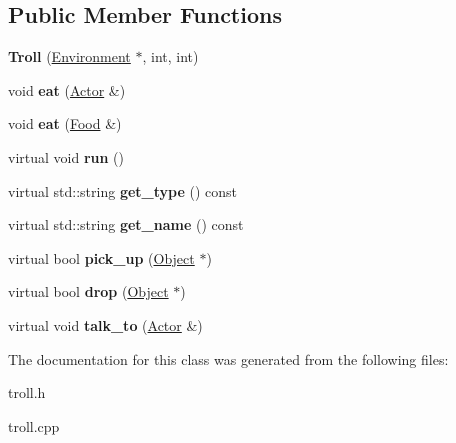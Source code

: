 \subsection*{Public Member Functions}
\begin{DoxyCompactItemize}
\item 
\hypertarget{classda__game_1_1Troll_a7b6cee5ab1339572982aa4f490b09b65}{
{\bfseries Troll} (\hyperlink{classda__game_1_1Environment}{Environment} $\ast$, int, int)}
\label{classda__game_1_1Troll_a7b6cee5ab1339572982aa4f490b09b65}

\item 
\hypertarget{classda__game_1_1Troll_a5ff7be42450036dee76060892ed52dd6}{
void {\bfseries eat} (\hyperlink{classda__game_1_1Actor}{Actor} \&)}
\label{classda__game_1_1Troll_a5ff7be42450036dee76060892ed52dd6}

\item 
\hypertarget{classda__game_1_1Troll_a50a5ca63166711c2ce631c6ec5cd2cad}{
void {\bfseries eat} (\hyperlink{classda__game_1_1Food}{Food} \&)}
\label{classda__game_1_1Troll_a50a5ca63166711c2ce631c6ec5cd2cad}

\item 
\hypertarget{classda__game_1_1Troll_a52d102598f13c6dea7311cc16d8bbc50}{
virtual void {\bfseries run} ()}
\label{classda__game_1_1Troll_a52d102598f13c6dea7311cc16d8bbc50}

\item 
\hypertarget{classda__game_1_1Troll_ac00b5c9350f950390cef9fcb365fd4e2}{
virtual std::string {\bfseries get\_\-type} () const }
\label{classda__game_1_1Troll_ac00b5c9350f950390cef9fcb365fd4e2}

\item 
\hypertarget{classda__game_1_1Troll_a1cedb77ac8a2c55cfec57fa26c8cd5a3}{
virtual std::string {\bfseries get\_\-name} () const }
\label{classda__game_1_1Troll_a1cedb77ac8a2c55cfec57fa26c8cd5a3}

\item 
\hypertarget{classda__game_1_1Troll_a5f287d22486248ee404460c9843d864b}{
virtual bool {\bfseries pick\_\-up} (\hyperlink{classda__game_1_1Object}{Object} $\ast$)}
\label{classda__game_1_1Troll_a5f287d22486248ee404460c9843d864b}

\item 
\hypertarget{classda__game_1_1Troll_a263bc077ba47e77a5811fccf9cd34be6}{
virtual bool {\bfseries drop} (\hyperlink{classda__game_1_1Object}{Object} $\ast$)}
\label{classda__game_1_1Troll_a263bc077ba47e77a5811fccf9cd34be6}

\item 
\hypertarget{classda__game_1_1Troll_af44fd0a347a5a4fd6458f2a7768d887a}{
virtual void {\bfseries talk\_\-to} (\hyperlink{classda__game_1_1Actor}{Actor} \&)}
\label{classda__game_1_1Troll_af44fd0a347a5a4fd6458f2a7768d887a}

\end{DoxyCompactItemize}


The documentation for this class was generated from the following files:\begin{DoxyCompactItemize}
\item 
troll.h\item 
troll.cpp\end{DoxyCompactItemize}
